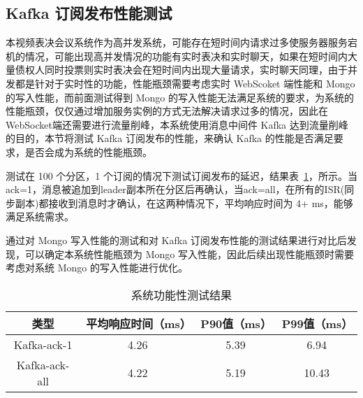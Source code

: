   \subsection{Kafka 订阅发布性能测试}
  本视频表决会议系统作为高并发系统，可能存在短时间内请求过多使服务器服务宕机的情况，可能出现高并发情况的功能有实时表决和实时聊天，如果在短时间内大量债权人同时投票则实时表决会在短时间内出现大量请求，实时聊天同理，由于并发都是针对于实时性的功能，性能瓶颈需要考虑实时 WebScoket 端性能和 Mongo 的写入性能，而前面测试得到 Mongo 的写入性能无法满足系统的要求，为系统的性能瓶颈，仅仅通过增加服务实例的方式无法解决请求过多的情况，因此在 WebSocket端还需要进行流量削峰，本系统使用消息中间件 Kafka 达到流量削峰的目的，本节将测试 Kafka 订阅发布的性能，来确认 Kafka 的性能是否满足要求，是否会成为系统的性能瓶颈。

  测试在 100 个分区，1 个订阅的情况下测试订阅发布的延迟，结果表~\ref{fig:test6}，所示。当ack=1，消息被追加到leader副本所在分区后再确认，当ack=all，在所有的ISR(同步副本)都接收到消息时才确认，在这两种情况下，平均响应时间为 4+ ms，能够满足系统需求。

  通过对 Mongo 写入性能的测试和对 Kafka 订阅发布性能的测试结果进行对比后发现，可以确定本系统性能瓶颈为 Mongo 写入性能，因此后续出现性能瓶颈时需要考虑对系统 Mongo 的写入性能进行优化。

  \begin{table}[h!]
    \begin{center}
      \caption{系统功能性测试结果}
      \label{fig:test6}
      \begin{tabular}{ c c c c }
        \hline
        \textbf{类型} & \textbf{平均响应时间（ms）
        } & \textbf{P90值（ms）
        } & \textbf{P99值（ms）
        } \\
        \hline
        Kafka-ack-1 & 4.26 & 5.39 & 6.94 \\
        Kafka-ack-all & 4.22 & 5.19 & 10.43 \\
        \hline
      \end{tabular}
    \end{center}
  \end{table}